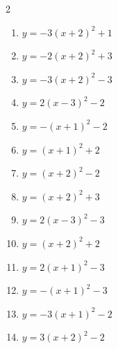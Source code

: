 \documentclass[b5paper,10pt]{ltjsarticle}
\begin{document}
\begin{multicols}{ 2 }
\begin{enumerate}
\vspace{170pt}\item $\displaystyle{} y= -3\left( x+2\right)^{2}+1$

\vspace{170pt}\item $\displaystyle{} y= -2\left( x+2\right)^{2}+3$

\vspace{170pt}\item $\displaystyle{} y= -3\left( x+2\right)^{2}-3$

\vspace{170pt}\item $\displaystyle{} y= 2\left( x-3\right)^{2}-2$

\vspace{170pt}\item $\displaystyle{} y= -\left( x+1\right)^{2}-2$

\vspace{170pt}\item $\displaystyle{} y= \left( x+1\right)^{2}+2$

\vspace{170pt}\item $\displaystyle{} y= \left( x+2\right)^{2}-2$

\vspace{170pt}\item $\displaystyle{} y= \left( x+2\right)^{2}+3$

\vspace{170pt}\item $\displaystyle{} y= 2\left( x-3\right)^{2}-3$

\vspace{170pt}\item $\displaystyle{} y= \left( x+2\right)^{2}+2$

\vspace{170pt}\item $\displaystyle{} y= 2\left( x+1\right)^{2}-3$

\vspace{170pt}\item $\displaystyle{} y= -\left( x+1\right)^{2}-3$

\vspace{170pt}\item $\displaystyle{} y= -3\left( x+1\right)^{2}-2$

\vspace{170pt}\item $\displaystyle{} y= 3\left( x+2\right)^{2}-2$


\end{enumerate}
\end{multicols}
\end{document}
